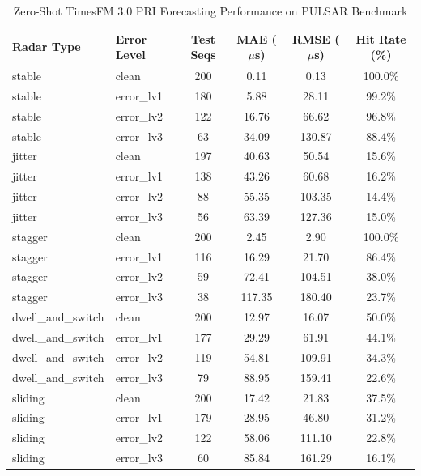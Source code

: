 \begin{table}[htbp]
\centering
\caption{Zero-Shot TimesFM 3.0 PRI Forecasting Performance on PULSAR Benchmark}
\label{tab:timesfm_zero_shot}
\begin{tabular}{llcccc}
\hline
\textbf{Radar Type} & \textbf{Error Level} & \textbf{Test Seqs} & \textbf{MAE ($\mu$s)} & \textbf{RMSE ($\mu$s)} & \textbf{Hit Rate (\%)} \\
\hline
stable & clean & 200 & 0.11 & 0.13 & 100.0\% \\
stable & error\_lv1 & 180 & 5.88 & 28.11 & 99.2\% \\
stable & error\_lv2 & 122 & 16.76 & 66.62 & 96.8\% \\
stable & error\_lv3 & 63 & 34.09 & 130.87 & 88.4\% \\
jitter & clean & 197 & 40.63 & 50.54 & 15.6\% \\
jitter & error\_lv1 & 138 & 43.26 & 60.68 & 16.2\% \\
jitter & error\_lv2 & 88 & 55.35 & 103.35 & 14.4\% \\
jitter & error\_lv3 & 56 & 63.39 & 127.36 & 15.0\% \\
stagger & clean & 200 & 2.45 & 2.90 & 100.0\% \\
stagger & error\_lv1 & 116 & 16.29 & 21.70 & 86.4\% \\
stagger & error\_lv2 & 59 & 72.41 & 104.51 & 38.0\% \\
stagger & error\_lv3 & 38 & 117.35 & 180.40 & 23.7\% \\
dwell\_and\_switch & clean & 200 & 12.97 & 16.07 & 50.0\% \\
dwell\_and\_switch & error\_lv1 & 177 & 29.29 & 61.91 & 44.1\% \\
dwell\_and\_switch & error\_lv2 & 119 & 54.81 & 109.91 & 34.3\% \\
dwell\_and\_switch & error\_lv3 & 79 & 88.95 & 159.41 & 22.6\% \\
sliding & clean & 200 & 17.42 & 21.83 & 37.5\% \\
sliding & error\_lv1 & 179 & 28.95 & 46.80 & 31.2\% \\
sliding & error\_lv2 & 122 & 58.06 & 111.10 & 22.8\% \\
sliding & error\_lv3 & 60 & 85.84 & 161.29 & 16.1\% \\
\hline
\end{tabular}
\end{table}